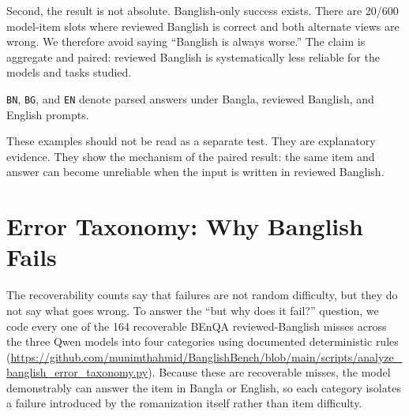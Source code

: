 Second, the result is not absolute. Banglish-only success exists. There are 20/600 model-item slots where reviewed Banglish is correct and both alternate views are wrong. We therefore avoid saying ``Banglish is always worse.'' The claim is aggregate and paired: reviewed Banglish is systematically less reliable for the models and tasks studied.

\begin{table}[H]
\centering
\caption{Example recoverable reviewed-Banglish misses from the BEnQA extension}
\label{tab:recoverable-examples}
\small
{}

\smallskip
{\footnotesize \texttt{BN}, \texttt{BG}, and \texttt{EN} denote parsed answers under Bangla, reviewed Banglish, and English prompts.}
\end{table}

These examples should not be read as a separate test. They are explanatory evidence. They show the mechanism of the paired result: the same item and answer can become unreliable when the input is written in reviewed Banglish.

\section{Error Taxonomy: Why Banglish Fails}

The recoverability counts say that failures are not random difficulty, but they do not say what goes wrong. To answer the ``but why does it fail?'' question, we code every one of the 164 recoverable BEnQA reviewed-Banglish misses across the three Qwen models into four categories using documented deterministic rules (\url{https://github.com/munimthahmid/BanglishBench/blob/main/scripts/analyze_banglish_error_taxonomy.py}). Because these are recoverable misses, the model demonstrably can answer the item in Bangla or English, so each category isolates a failure introduced by the romanization itself rather than item difficulty.

